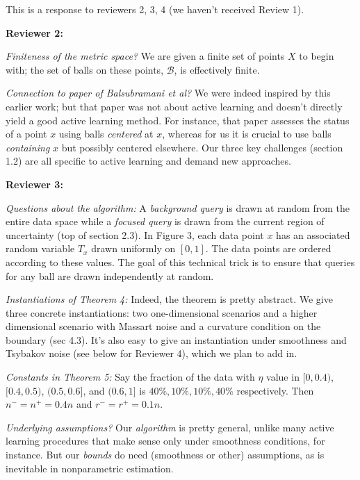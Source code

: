 \documentclass[12pt]{colt2023} %
\begin{document}
\title{}
This is a response to reviewers 2, 3, 4 (we haven't received Review 1).

\vspace{.1in}

\noindent
{\bf Reviewer 2:} 

\noindent
\emph{Finiteness of the metric space?} We are given a finite set of points $X$ to begin with; the set of balls on these points, $\mathcal{B}$, is effectively finite.

\noindent
\emph{Connection to paper of Balsubramani et al?} We were indeed inspired by this earlier work; but that paper was not about active learning and doesn't directly yield a good active learning method. For instance, that paper assesses the status of a point $x$ using balls \emph{centered} at $x$, whereas for us it is crucial to use balls \emph{containing} $x$ but possibly centered elsewhere. Our three key challenges (section 1.2) are all specific to active learning and demand new approaches. 

\vspace{.1in}
\noindent
{\bf Reviewer 3:} 

\noindent
\emph{Questions about the algorithm:} A \emph{background query} is drawn at random from the entire data space while a \emph{focused query} is drawn from the current region of uncertainty (top of section 2.3). In Figure 3, each data point $x$ has an associated random variable $T_x$ drawn uniformly on $[0,1]$. The data points are ordered according to these values. The goal of this technical trick is to ensure that queries for any ball are drawn independently at random.

\noindent
\emph{Instantiations of Theorem 4:} Indeed, the theorem is pretty abstract. We give three concrete instantiations: two one-dimensional scenarios and a higher dimensional scenario with Massart noise and a curvature condition on the boundary (sec 4.3). It's also easy to give an instantiation under smoothness and Tsybakov noise (see below for Reviewer 4), which we plan to add in.

\noindent
\emph{Constants in Theorem 5:} Say the fraction of the data with $\eta$ value in $[0,0.4)$, $[0.4, 0.5)$, $(0.5, 0.6]$, and $(0.6,1]$ is $40\%, 10\%, 10\%, 40\%$ respectively. Then $n^- = n^+ = 0.4n$ and $r^- = r^+ = 0.1n$.

\noindent
\emph{Underlying assumptions?} Our \emph{algorithm} is pretty general, unlike many active learning procedures that make sense only under smoothness conditions, for instance. But our \emph{bounds} do need (smoothness or other) assumptions, as is inevitable in nonparametric estimation.
\end{document}
